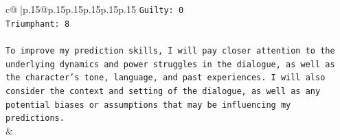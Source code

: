 \documentclass{article}
\begin{document}
{\begin{supertabular}{c@{$\;$}|p{.15\linewidth}@{}p{.15\linewidth}p{.15\linewidth}p{.15\linewidth}p{.15\linewidth}p{.15\linewidth}}
{{{\texttt{Guilty: 0} \\
\texttt{Triumphant: 8} \\
\\ 
\texttt{To improve my prediction skills, I will pay closer attention to the underlying dynamics and power struggles in the dialogue, as well as the character's tone, language, and past experiences. I will also consider the context and setting of the dialogue, as well as any potential biases or assumptions that may be influencing my predictions.} \\
            }
        }
    }
    & \\ \\

\end{supertabular}
}
\end{document}
